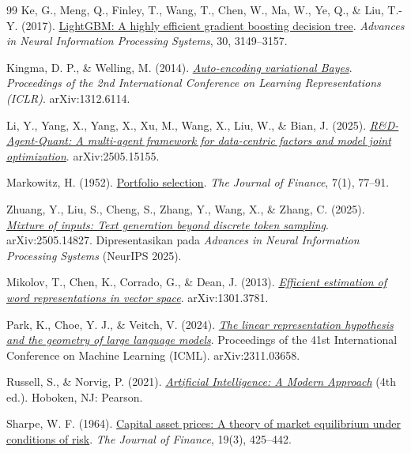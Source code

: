 \begin{thebibliography}{99}
Ke, G., Meng, Q., Finley, T., Wang, T., Chen, W., Ma, W., Ye, Q., \& Liu, T.-Y.
(2017).
\href{https://papers.nips.cc/paper/6907-lightgbm-a-highly-efficient-gradient-boosting-decision-tree}{LightGBM:
A highly efficient gradient boosting decision tree}. \emph{Advances in Neural
Information Processing Systems}, 30, 3149--3157.

Kingma, D. P., \& Welling, M. (2014).
\href{https://arxiv.org/abs/1312.6114}{\emph{Auto-encoding variational Bayes}}.
\emph{Proceedings of the 2nd International Conference on Learning
Representations (ICLR)}. arXiv:1312.6114.

Li, Y., Yang, X., Yang, X., Xu, M., Wang, X., Liu, W., \& Bian, J. (2025).
\href{https://arxiv.org/abs/2505.15155}{\emph{R\&D-Agent-Quant: A multi-agent
framework for data-centric factors and model joint optimization}}.
arXiv:2505.15155.

Markowitz, H. (1952).
\href{https://doi.org/10.1111/j.1540-6261.1952.tb01525.x}{Portfolio selection}.
\emph{The Journal of Finance}, 7(1), 77--91.

Zhuang, Y., Liu, S., Cheng, S., Zhang, Y., Wang, X., \& Zhang, C. (2025).
\href{https://arxiv.org/abs/2505.14827}{\emph{Mixture of inputs: Text
generation beyond discrete token sampling}}. arXiv:2505.14827. Dipresentasikan
pada \emph{Advances in Neural Information Processing Systems} (NeurIPS 2025).

Mikolov, T., Chen, K., Corrado, G., \& Dean, J. (2013).
\href{https://arxiv.org/abs/1301.3781}{\emph{Efficient estimation of word
representations in vector space}}. arXiv:1301.3781.

Park, K., Choe, Y. J., \& Veitch, V. (2024).
\href{https://arxiv.org/abs/2311.03658}{\emph{The linear representation hypothesis
and the geometry of large language models}}. Proceedings of the 41st International
Conference on Machine Learning (ICML). arXiv:2311.03658.

Russell, S., \& Norvig, P. (2021).
\href{https://archive.org/details/artificialintell0000russ_v4h1}{\emph{Artificial
Intelligence: A Modern Approach}} (4th ed.). Hoboken, NJ: Pearson.

Sharpe, W. F. (1964).
\href{https://doi.org/10.1111/j.1540-6261.1964.tb02865.x}{Capital asset prices:
A theory of market equilibrium under conditions of risk}. \emph{The Journal of
Finance}, 19(3), 425--442.


\end{thebibliography}
